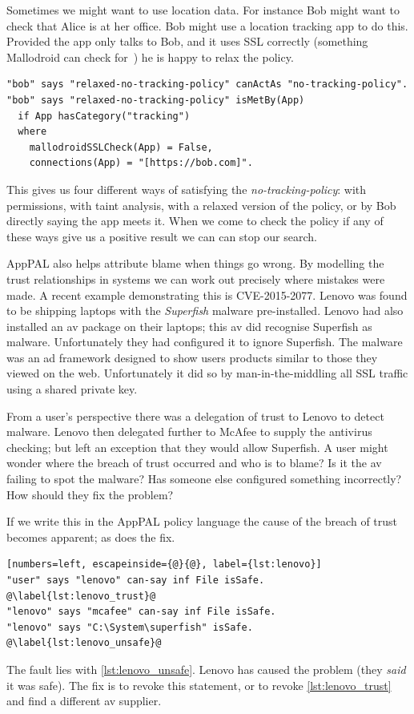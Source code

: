 \documentclass[a4paper]{scrartcl}
\begin{document}
Sometimes we might want to use location data.
For instance Bob might want to check that Alice is at her office.
Bob might use a location tracking app to do this.
Provided the app only talks to Bob, and it uses SSL correctly (something Mallodroid can check for~\citep{Fahl:2012dj}) he is happy to relax the policy.

\begin{lstlisting}
"bob" says "relaxed-no-tracking-policy" canActAs "no-tracking-policy".
"bob" says "relaxed-no-tracking-policy" isMetBy(App)
  if App hasCategory("tracking")
  where 
    mallodroidSSLCheck(App) = False,
    connections(App) = "[https://bob.com]".
\end{lstlisting}

This gives us four different ways of satisfying the \emph{no-tracking-policy}:
  with permissions, 
  with taint analysis,
  with a relaxed version of the policy,
  or by Bob directly saying the app meets it.
When we come to check the policy if any of these ways give us a positive result we can can stop our search.

AppPAL also helps attribute blame when things go wrong.
By modelling the trust relationships in systems we can work out precisely where mistakes were made.
A recent example demonstrating this is \textsc{CVE-2015-2077}.
Lenovo was found to be shipping laptops with the \emph{Superfish} malware pre-installed.
Lenovo had also installed an \ac{av} package on their laptops; this \ac{av} did recognise Superfish as malware.
Unfortunately they had configured it to ignore Superfish.
The malware was an ad framework designed to show users products similar to those they viewed on the web.
Unfortunately it did so by man-in-the-middling all SSL traffic using a shared private key.

From a user's perspective there was a delegation of trust to Lenovo to detect malware.
Lenovo then delegated further to McAfee to supply the antivirus checking; but left an exception that they would allow Superfish.
A user might wonder where the breach of trust occurred and who is to blame?  
Is it the \ac{av} failing to spot the malware? 
Has someone else configured something incorrectly?
How should they fix the problem?

If we write this in the AppPAL policy language the cause of the breach of trust becomes apparent; as does the fix.
\begin{lstlisting}[numbers=left, escapeinside={@}{@}, label={lst:lenovo}]
"user" says "lenovo" can-say inf File isSafe. @\label{lst:lenovo_trust}@
"lenovo" says "mcafee" can-say inf File isSafe.
"lenovo" says "C:\System\superfish" isSafe. @\label{lst:lenovo_unsafe}@
\end{lstlisting}
The fault lies with \autoref{lst:lenovo_unsafe}.  
Lenovo has caused the problem (they \emph{said} it was safe).
The fix is to revoke this statement, or to revoke \autoref{lst:lenovo_trust} and find a different \ac{av} supplier.
\end{document}
